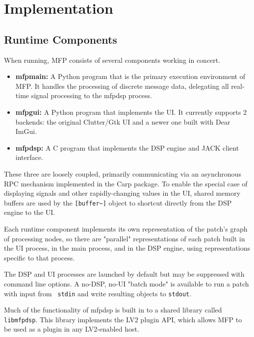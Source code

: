 \documentclass[a4paper]{article}
\def\:{\hskip0pt}
\begin{document}
\section{Implementation}

\subsection{Runtime Components}

When running, MFP consists of several components working in concert.

\begin{itemize}
\item[]
{\bf mfpmain:} A Python program that is the primary execution
environment of MFP. It handles the processing of discrete
message data, delegating all real\:-\:time signal processing to the
mfpdsp process.

\item[]
{\bf mfpgui:} A Python program that implements the UI. It currently
supports 2 backends: the original Clutter/Gtk UI and a newer one
built with Dear ImGui.

\item[]
{\bf mfpdsp:} A C program that implements the DSP engine and JACK
client interface.
\end{itemize}

These three are loosely coupled, primarily communicating via an
asynchronous RPC mechanism implemented in the Carp
\cite{Gribble:Carp} package. To enable the special case of
displaying signals and other rapidly-changing values in the UI,
shared memory buffers are used by the {\tt [buffer\textasciitilde]} object to
shortcut directly from the DSP engine to the UI.

Each runtime component implements its own representation of the
patch's graph of processing nodes, so there are "parallel"
representations of each patch built in the UI process, in the
main process, and in the DSP engine, using representations
specific to that process.

The DSP and UI processes are launched by default but may be
suppressed with command line options. A no\:-\:DSP, no\:-\:UI
"batch mode" is available to run a patch with input from {\tt
stdin} and write resulting objects to {\tt stdout}.

Much of the functionality of mfpdsp is built in to a shared
library called {\tt libmfpdsp}. This library implements the LV2
plugin API, which allows MFP to be used as a plugin in any
LV2-enabled host.
\end{document}
